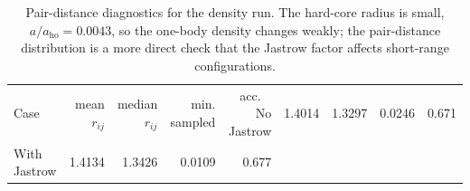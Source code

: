 \begin{table}[t]
\centering
\caption{Pair-distance diagnostics for the density run. The hard-core radius is small, $a/a_{\mathrm{ho}}=0.0043$, so the one-body density changes weakly; the pair-distance distribution is a more direct check that the Jastrow factor affects short-range configurations.}
\label{tab:1h-pair-distance}
\begin{tabular}{lrrrr}
\toprule
Case & mean $r_{ij}$ & median $r_{ij}$ & min. sampled & acc. \
\midrule
No Jastrow & 1.4014 & 1.3297 & 0.0246 & 0.671 \\
With Jastrow & 1.4134 & 1.3426 & 0.0109 & 0.677 \\
\bottomrule
\end{tabular}
\end{table}

